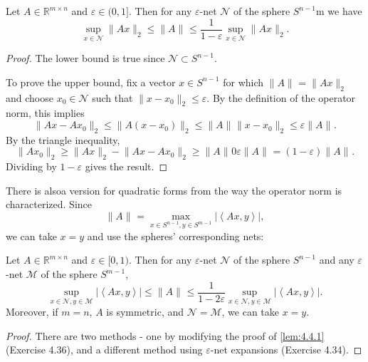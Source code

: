 \begin{lemma}
\label{lem:4.4.1}
Let $A \in \mathbb{R}^{m \times n}$ and $\varepsilon \in (0, 1]$. Then for any $\varepsilon$-net $\mathcal{N}$ 
of the sphere $S^{n - 1}$m we have 
\[ \sup_{x \in \mathcal{N}} \lVert Ax \rVert_{2} \leq \lVert A \rVert_{} 
\leq \frac{1}{1 - \varepsilon} \sup_{x \in \mathcal{N}} \lVert Ax \rVert_{2}. \]
\end{lemma}

\begin{proof}
The lower bound is true since $\mathcal{N} \subset S^{n - 1}$. 

To prove the upper bound, fix a vector $x \in S^{n - 1}$ for which $\lVert A \rVert_{} = \lVert Ax \rVert_{2}$ 
and choose $x_0 \in \mathcal{N}$ such that $\lVert x - x_0 \rVert_{2} \leq \varepsilon$. By the definition 
of the operator norm, this implies 
\[ \lVert Ax - Ax_0 \rVert_{2} \leq \lVert A(x - x_0) \rVert_{2} 
\leq \lVert A \rVert_{} \lVert x - x_0 \rVert_{2} \leq \varepsilon \lVert A \rVert_{}. \]
By the triangle inequality, 
\[ \lVert Ax_0 \rVert_{2} \geq \lVert Ax \rVert_{2} - \lVert Ax - Ax_0 \rVert_{2} 
\geq \lVert A \rVert_{} 0 \varepsilon \lVert A \rVert_{} = (1 - \varepsilon)\lVert A \rVert_{}. \]
Dividing by $1 - \varepsilon$ gives the result.
\end{proof}

There is alsoa version for quadratic forms from the way the operator norm is characterized. Since 
\[ \lVert A \rVert_{} = \max_{x \in S^{n - 1}, y \in S^{m - 1}} 
|\left\langle Ax, y \right\rangle|, \]
we can take $x = y$ and use the spheres' corresponding nets:

\begin{lemma}
\label{lem:4.4.2}
Let $A \in \mathbb{R}^{m \times n}$ and $\varepsilon \in [0, 1)$. Then for any $\varepsilon$-net $\mathcal{N}$ 
of the sphere $S^{n - 1}$ and any $\varepsilon$-net $\mathcal{M}$ of the sphere $S^{m - 1}$, 
\[ \sup_{x \in \mathcal{N}, y \in \mathcal{M}} |\left\langle Ax, y \right\rangle| 
\leq \lVert A \rVert_{} \leq \frac{1}{1 - 2 \varepsilon} \sup_{x \in \mathcal{N}, y \in \mathcal{M}} 
|\left\langle Ax, y \right\rangle|. \]
Moreover, if $m = n$, $A$ is symmetric, and $\mathcal{N} = \mathcal{M}$, we can take $x = y$.
\end{lemma}

\begin{proof}
There are two methods - one by modifying the proof of \cref{lem:4.4.1} (Exercise 4.36), and a different method 
using $\varepsilon$-net expansions (Exercise 4.34).
\end{proof}

